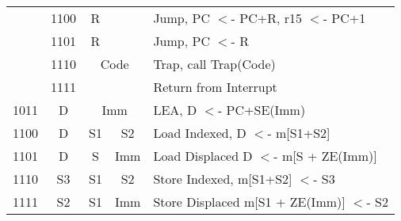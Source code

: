 \begin{tabular}{|c|c|c|c|p{3in}|}
         & 1100     & R        &          & Jump, PC $<$- PC+R, r15 $<$- PC+1 \\
         & 1101     & R        &          & Jump, PC $<$- R \\ \cline{3-4}
         & 1110     & \multicolumn{2}{|c|}{Code} & Trap, call Trap(Code) \\ \cline{3-4}
         & 1111     &          &          & Return from Interrupt \\ \cline{3-4}
1011     & D        & \multicolumn{2}{|c|}{Imm} & LEA, D $<$- PC+SE(Imm) \\ \hline\hline
1100     & D        & S1       & S2       & Load Indexed, D $<$- m[S1+S2]  \\
1101     & D        & S        & Imm      & Load Displaced D $<$- m[S + ZE(Imm)]  \\ \hline
1110     & S3       & S1       & S2       & Store Indexed, m[S1+S2] $<$- S3 \\
1111     & S2       & S1       & Imm      & Store Displaced m[S1 + ZE(Imm)] $<$- S2 \\ \hline
\end{tabular}

